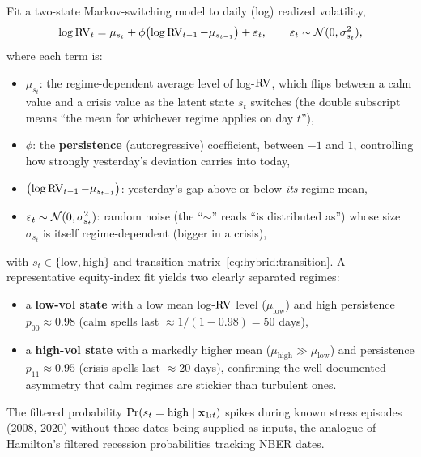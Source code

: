 \begin{keyresult}
Fit a two-state Markov-switching model to daily (log) realized volatility,
\begin{equation}\label{eq:hybrid:ms-rv}
  \log \operatorname{RV}_t = \mu_{s_t} + \phi\bigl(\log \operatorname{RV}_{t-1} - \mu_{s_{t-1}}\bigr)
    + \varepsilon_t,
  \qquad \varepsilon_t \sim \mathcal{N}(0, \sigma_{s_t}^2),
\end{equation}
where each term is:
\begin{itemize}
  \item $\mu_{s_t}$: the regime-dependent average level of log-$\operatorname{RV}$,
        which flips between a calm value and a crisis value as the latent
        state $s_t$ switches (the double subscript means ``the mean for
        whichever regime applies on day $t$''),
  \item $\phi$: the \textbf{persistence} (autoregressive) coefficient,
        between $-1$ and $1$, controlling how strongly yesterday's deviation
        carries into today,
  \item $\bigl(\log \operatorname{RV}_{t-1} - \mu_{s_{t-1}}\bigr)$: yesterday's gap
        above or below \emph{its} regime mean,
  \item $\varepsilon_t \sim \mathcal{N}(0,\sigma_{s_t}^2)$: random noise (the
        ``$\sim$'' reads ``is distributed as'') whose size $\sigma_{s_t}$
        is itself regime-dependent (bigger in a crisis),
\end{itemize}
with $s_t \in \{\text{low},\text{high}\}$ and transition
matrix~\eqref{eq:hybrid:transition}.  A representative equity-index fit
yields two clearly separated regimes:
\begin{itemize}
  \item a \textbf{low-vol state} with a low mean log-$\operatorname{RV}$ level
        ($\mu_{\text{low}}$) and high persistence
        $p_{00} \approx 0.98$ (calm spells last $\approx 1/(1-0.98) = 50$
        days),
  \item a \textbf{high-vol state} with a markedly higher mean
        ($\mu_{\text{high}} \gg \mu_{\text{low}}$) and persistence
        $p_{11} \approx 0.95$ (crisis spells last $\approx 20$ days),
        confirming the well-documented asymmetry that calm regimes are
        stickier than turbulent ones.
\end{itemize}
The filtered probability $\Pr(s_t = \text{high} \mid \mathbf{x}_{1:t})$ spikes
during known stress episodes (2008, 2020) without those dates being
supplied as inputs, the analogue of Hamilton's filtered recession
probabilities tracking NBER dates.
\end{keyresult}

